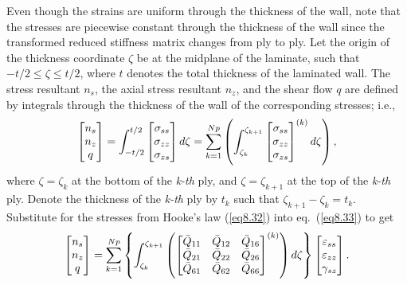 \documentclass{AeroStructure-ERJohnson}
\begin{document}
Even though the strains are uniform through the thickness of the
wall, note that the stresses are piecewise constant through the
thickness of the wall since the transformed reduced stiffness
matrix changes from ply to ply. Let the origin of the thickness
coordinate $\zeta$ be at the midplane of the laminate, such that
$-t/2 \leq \zeta \leq t/2$, where $t$ denotes the total thickness
of the laminated wall. The stress resultant $n_{s}$, the axial
stress resultant $n_{z}$, and the shear flow $q$ are defined by
integrals through the thickness of the wall of the corresponding
stresses; i.e.,
\begin{align}\label{eq8.33}
\left[\begin{array}{@{}c@{}} n_{s}\\
n_{z}\\
q
\end{array}\right]=\int_{-t/ 2}^{t/
2}\left[\begin{array}{@{}c@{}} \sigma_{s s}\\
\sigma_{z z}\\
\sigma_{z s} \end{array}\right] d \zeta=
\sum_{k=1}^{Np}
\left(\int^{\zeta_{k+1}}_{\zeta_k}
\left[
\begin{array}{@{}c@{}}
\sigma_{s s}\\
\sigma_{z z}\\
\sigma_{z s} \end{array}\right]^{(k)} d\zeta\right),
\end{align}
where $\zeta=\zeta_{k}$ at the bottom of the \textit{k-th} ply,
and $\zeta=\zeta_{k+1}$ at the top of the \textit{k-th} ply. Denote
the thickness of the \textit{k-th} ply by $t_{k}$ such that
$\zeta_{k+1}-\zeta_{k}=t_{k}$. Substitute for the stresses from
Hooke's law (\ref{eq8.32}) into eq.~(\ref{eq8.33}) to get
\begin{align}\label{eq8.34}
\left[\begin{array}{@{}c@{}} n_{s}\\
n_{z}\\
q
\end{array}\right]
=\sum_{k=1}^{N p}\left\{
\int_{\zeta_ {k}}^{\zeta_{k+1}}
\left(\left[\begin{array}{@{}lll@{}}
\bar{Q}_{11} & \bar{Q}_{12} & \bar{Q}_{16}\\
\bar{Q}_{21} & \bar{Q}_{22} & \bar{Q}_{26}\\
\bar{Q}_{61} & \bar{Q}_{62} & \bar{Q}_{66}
\end{array}\right]^{(k)}\right) d\zeta
\right\}
\left[\begin{array}{@{}c@{}}
\varepsilon_{s s}\\
\varepsilon_{z z}\\
\gamma_{s z}
\end{array}\right].
\end{align}
\end{document}
